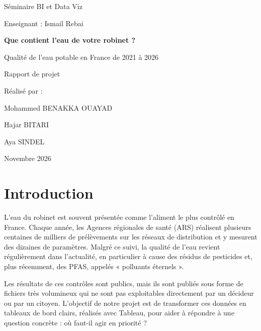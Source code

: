 \documentclass[11pt,a4paper]{article}
\begin{document}
\begin{titlepage}
\centering
\vspace*{2cm}
{\large Séminaire BI et Data Viz\par}
\vspace{0.3cm}
{\large Enseignant : Ismail Rebai\par}
\vspace{3cm}
{\LARGE\bfseries Que contient l'eau de votre robinet ?\par}
\vspace{0.6cm}
{\Large Qualité de l'eau potable en France de 2021 à 2026\par}
\vspace{0.3cm}
{\large Rapport de projet\par}
\vspace{3cm}
{\large Réalisé par :\par}
\vspace{0.3cm}
Mohammed BENAKKA OUAYAD\par
Hajar BITARI\par
Aya SINDEL\par
\vfill
{\large Novembre 2026\par}
\end{titlepage}

\tableofcontents
\newpage

\section{Introduction}

L'eau du robinet est souvent présentée comme l'aliment le plus contrôlé en France. Chaque année, les Agences régionales de santé (ARS) réalisent plusieurs centaines de milliers de prélèvements sur les réseaux de distribution et y mesurent des dizaines de paramètres. Malgré ce suivi, la qualité de l'eau revient régulièrement dans l'actualité, en particulier à cause des résidus de pesticides et, plus récemment, des PFAS, appelés « polluants éternels ».

Les résultats de ces contrôles sont publics, mais ils sont publiés sous forme de fichiers très volumineux qui ne sont pas exploitables directement par un décideur ou par un citoyen. L'objectif de notre projet est de transformer ces données en tableaux de bord clairs, réalisés avec Tableau, pour aider à répondre à une question concrète : où faut-il agir en priorité ?
\end{document}
